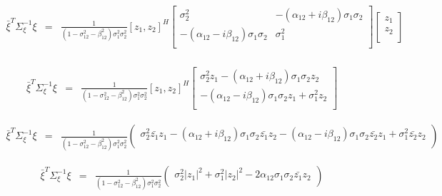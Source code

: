 \documentclass[12pt,a4paper]{article}
\begin{document}
\begin{equation}\label{sec2eqn6}
\begin{array}{ccc}
	\bar{\xi}^{T}\Sigma_{\xi}^{-1}\xi&=&\frac{1}{(1 - \sigma_{12}^{2}- \beta_{12}^2)\sigma_{1}^2\sigma_{2}^2} [z_1,z_2]^{H}\left[
\begin{array}{cc}
	\sigma_2^2                                &  -(\alpha_{12}+i\beta_{12})\sigma_1\sigma_2  \\
	-(\alpha_{12}-i\beta_{12})\sigma_1\sigma_2 & \sigma_1^2 \\
\end{array}
\right]
	\left[
\begin{array}{c}
	z_1  \\
	z_2 \\
\end{array}\right]\\
\end{array}
\end{equation}

\begin{equation}\label{sec2eqn7}
\begin{array}{ccc}
	\bar{\xi}^{T}\Sigma_{\xi}^{-1}\xi&=&\frac{1}{(1 - \sigma_{12}^{2}- \beta_{12}^2)\sigma_{1}^2\sigma_{2}^2} [z_1,z_2]^{H}\left[
\begin{array}{cc}
	\sigma_2^2z_1-(\alpha_{12}+i\beta_{12})\sigma_1\sigma_2z_2  \\
	-(\alpha_{12}-i\beta_{12})\sigma_1\sigma_2z_1+\sigma_1^2z_2 \\
\end{array}
\right]
\end{array}
\end{equation}

\begin{equation}\label{sec2eqn8}
\begin{array}{ccc}
	\bar{\xi}^{T}\Sigma_{\xi}^{-1}\xi&=&\frac{1}{(1 - \sigma_{12}^{2}- \beta_{12}^2)\sigma_{1}^2\sigma_{2}^2}\left(
\begin{array}{c}
	\sigma_2^2\bar{z_1}z_1-(\alpha_{12}+i\beta_{12})\sigma_1\sigma_2\bar{z_1}z_2 
	-(\alpha_{12}-i\beta_{12})\sigma_1\sigma_2\bar{z_2}z_1+\sigma_1^2\bar{z_2}z_2 \\
\end{array}
	\right)
\end{array}
\end{equation}

\begin{equation}\label{sec2eqn9}
\begin{array}{ccc}
	\bar{\xi}^{T}\Sigma_{\xi}^{-1}\xi&=&\frac{1}{(1 - \sigma_{12}^{2}- \beta_{12}^2)\sigma_{1}^2\sigma_{2}^2}\left(
\begin{array}{c}
	\sigma_2^2|z_1|^2+\sigma_1^2|z_2|^2-2\alpha_{12}\sigma_1\sigma_2\bar{z_1}z_2 \\
\end{array}
	\right)
\end{array}
\end{equation}
\end{document}

